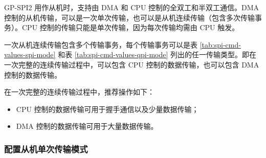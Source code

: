 \documentclass[main\_\_CN.tex]{subfiles}
\begin{document}
GP-SPI2 用作从机时，支持由 DMA 和 CPU 控制的全双工和半双工通信。DMA 控制的从机传输，可以是一次单次传输，也可以是从机连续传输（包含多次传输事务）。CPU 控制的传输只能是单次传输，因为每次传输均需由 CPU 触发。

一次从机连续传输包含多个传输事务，每个传输事务可以是表 \ref{tab:spi-cmd-values-spi-mode} 和表 \ref{tab:spi-cmd-values-qpi-mode} 列出的任一传输类型。即在一次完整的连续传输过程中，可以包含 CPU 控制的数据传输，也可以包含 DMA 控制的数据传输。

在一次完整的连续传输过程中，推荐操作如下：

\begin{itemize}
    \item CPU 控制的数据传输可用于握手通信以及少量数据传输；

    \item DMA 控制的数据传输可用于大量数据传输。
\end{itemize}


\subsubsection{配置从机单次传输模式}\label{sec:spi-config-slave-single-trans}
\end{document}
